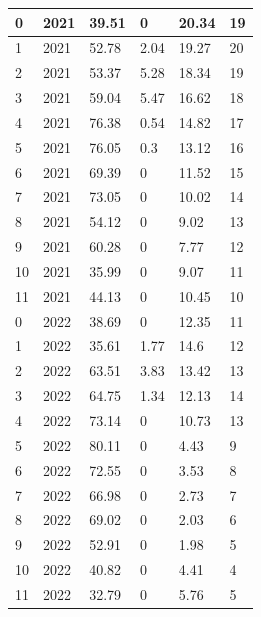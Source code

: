 \documentclass{article}
\begin{document}
\begin{longtable}{|l|l|l|l|l|l|}
0     & 2021 & 39.51 & 0      & 20.34  & 19      \\ \hline
1     & 2021 & 52.78 & 2.04   & 19.27  & 20      \\ \hline
2     & 2021 & 53.37 & 5.28   & 18.34  & 19      \\ \hline
3     & 2021 & 59.04 & 5.47   & 16.62  & 18      \\ \hline
4     & 2021 & 76.38 & 0.54   & 14.82  & 17      \\ \hline
5     & 2021 & 76.05 & 0.3    & 13.12  & 16      \\ \hline
6     & 2021 & 69.39 & 0      & 11.52  & 15      \\ \hline
7     & 2021 & 73.05 & 0      & 10.02  & 14      \\ \hline
8     & 2021 & 54.12 & 0      & 9.02   & 13      \\ \hline
9     & 2021 & 60.28 & 0      & 7.77   & 12      \\ \hline
10    & 2021 & 35.99 & 0      & 9.07   & 11      \\ \hline
11    & 2021 & 44.13 & 0      & 10.45  & 10      \\ \hline
0     & 2022 & 38.69 & 0      & 12.35  & 11      \\ \hline
1     & 2022 & 35.61 & 1.77   & 14.6   & 12      \\ \hline
2     & 2022 & 63.51 & 3.83   & 13.42  & 13      \\ \hline
3     & 2022 & 64.75 & 1.34   & 12.13  & 14      \\ \hline
4     & 2022 & 73.14 & 0      & 10.73  & 13      \\ \hline
5     & 2022 & 80.11 & 0      & 4.43   & 9       \\ \hline
6     & 2022 & 72.55 & 0      & 3.53   & 8       \\ \hline
7     & 2022 & 66.98 & 0      & 2.73   & 7       \\ \hline
8     & 2022 & 69.02 & 0      & 2.03   & 6       \\ \hline
9     & 2022 & 52.91 & 0      & 1.98   & 5       \\ \hline
10    & 2022 & 40.82 & 0      & 4.41   & 4       \\ \hline
11    & 2022 & 32.79 & 0      & 5.76   & 5       \\ \hline
\end{longtable}
\end{document}
